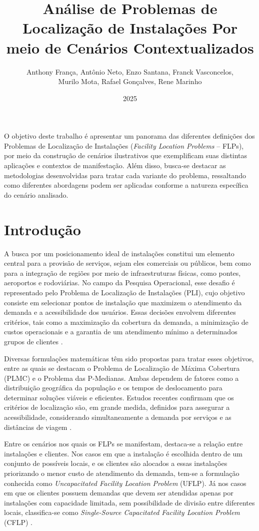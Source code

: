 \documentclass[12pt]{article}
\title{Análise de Problemas de Localização de Instalações Por meio de Cenários Contextualizados}
\author{Anthony França, Antônio Neto, Enzo Santana, Franck Vasconcelos,\\
Murilo Mota, Rafael Gonçalves, Rene Marinho}
\date{2025}
\begin{document}
 

\maketitle

     
\begin{resumo}
O objetivo deste trabalho é apresentar um panorama das diferentes definições dos Problemas de Localização de Instalações (\textit{Facility Location Problems} – FLPs), por meio da construção de cenários ilustrativos que exemplificam suas distintas aplicações e contextos de manifestação. Além disso, busca-se destacar as metodologias desenvolvidas para tratar cada variante do problema, ressaltando como diferentes abordagens podem ser aplicadas conforme a natureza específica do cenário analisado.
\end{resumo}

\section{Introdução}

A busca por um posicionamento ideal de instalações constitui um elemento central para a provisão de serviços, sejam eles comerciais ou públicos, bem como para a integração de regiões por meio de infraestruturas físicas, como pontes, aeroportos e rodoviárias. No campo da Pesquisa Operacional, esse desafio é representado pelo Problema de Localização de Instalações (PLI), cujo objetivo consiste em selecionar pontos de instalação que maximizem o atendimento da demanda e a acessibilidade dos usuários. Essas decisões envolvem diferentes critérios, tais como a maximização da cobertura da demanda, a minimização de custos operacionais e a garantia de um atendimento mínimo a determinados grupos de clientes \cite{SousaFilho2012}.

Diversas formulações matemáticas têm sido propostas para tratar esses objetivos, entre as quais se destacam o Problema de Localização de Máxima Cobertura (PLMC) e o Problema das P-Medianas. Ambas dependem de fatores como a distribuição geográfica da população e os tempos de deslocamento para determinar soluções viáveis e eficientes. Estudos recentes confirmam que os critérios de localização são, em grande medida, definidos para assegurar a acessibilidade, considerando simultaneamente a demanda por serviços e as distâncias de viagem \cite{KuoKung2025}.

Entre os cenários nos quais os FLPs se manifestam, destaca-se a relação entre instalações e clientes. Nos casos em que a instalação é escolhida dentro de um conjunto de possíveis locais, e os clientes são alocados a essas instalações priorizando o menor custo de atendimento da demanda, tem-se a formulação conhecida como \textit{Uncapacitated Facility Location Problem} (UFLP). Já nos casos em que os clientes possuem demandas que devem ser atendidas apenas por instalações com capacidade limitada, sem possibilidade de divisão entre diferentes locais, classifica-se como \textit{Single-Source Capacitated Facility Location Problem} (CFLP) \cite{Buesing2025}.
\end{document}
